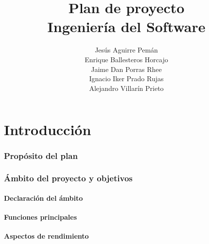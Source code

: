 \documentclass[spanish,a4paper,12pt]{report}	%
\begin{document}
\title{\textbf{\huge{Plan de proyecto}} \\ \vspace{0.3cm}
	\Large{Ingeniería del Software}}
\author{ Jesús Aguirre Pemán \\
	 Enrique Ballesteros Horcajo \\
	 Jaime Dan Porras Rhee \\
	 Ignacio Iker Prado Rujas \\
	 Alejandro Villarín Prieto }
\date{\Today}
\maketitle

\newpage
\mbox{}
\thispagestyle{empty}						%
\newpage


\tableofcontents 							%

\newpage
\mbox{}
\thispagestyle{empty}						%
\newpage



\part{Introducción}

	\section{Propósito del plan}

	\section{Ámbito del proyecto y objetivos}

		\subsection{Declaración del ámbito}

		\subsection{Funciones principales}

		\subsection{Aspectos de rendimiento}
\end{document}
